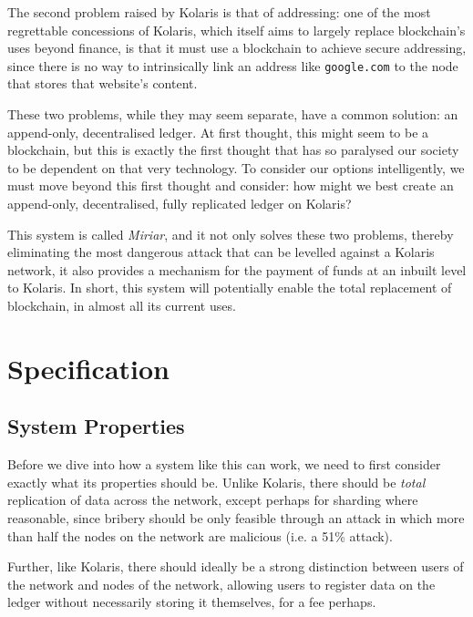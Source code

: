 \documentclass{extreport}
\begin{document}
The second problem raised by Kolaris is that of addressing: one of the most regrettable concessions of Kolaris, which itself aims to largely replace blockchain's uses beyond finance, is that it must use a blockchain to achieve secure addressing, since there is no way to intrinsically link an address like \texttt{google.com} to the node that stores that website's content.

These two problems, while they may seem separate, have a common solution: an append-only, decentralised ledger. At first thought, this might seem to be a blockchain, but this is exactly the first thought that has so paralysed our society to be dependent on that very technology. To consider our options intelligently, we must move beyond this first thought and consider: how might we best create an append-only, decentralised, fully replicated ledger on Kolaris?

This system is called \emph{Miriar}, and it not only solves these two problems, thereby eliminating the most dangerous attack that can be levelled against a Kolaris network, it also provides a mechanism for the payment of funds at an inbuilt level to Kolaris. In short, this system will potentially enable the total replacement of blockchain, in almost all its current uses.

\part{Specification}
\label{sec:orge7887dd}

\chapter{System Properties}
\label{sec:org6c6d895}

Before we dive into how a system like this can work, we need to first consider exactly what its properties should be. Unlike Kolaris, there should be \emph{total} replication of data across the network, except perhaps for sharding where reasonable, since bribery should be only feasible through an attack in which more than half the nodes on the network are malicious (i.e. a 51\% attack).

Further, like Kolaris, there should ideally be a strong distinction between users of the network and nodes of the network, allowing users to register data on the ledger without necessarily storing it themselves, for a fee perhaps.
\end{document}
